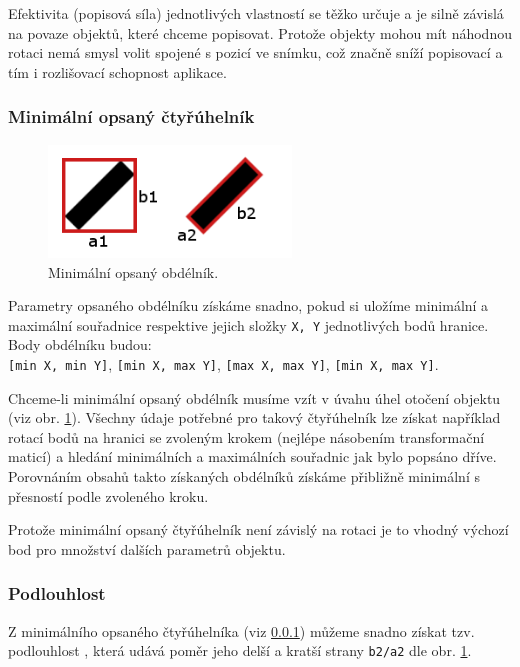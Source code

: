 \documentclass[12pt]{article}
\begin{document}
Efektivita (popisová síla) jednotlivých vlastností se těžko určuje a je silně závislá na povaze objektů, které chceme popisovat. Protože objekty mohou mít náhodnou rotaci nemá smysl volit spojené s pozicí ve snímku, což značně sníží popisovací a tím i rozlišovací schopnost aplikace.

\subsubsection{Minimální opsaný čtyřúhelník}
\label{minRectangle}
\begin{figure}
\centering
\vspace{-0.25cm}
\includegraphics[height=3cm]{MinRectangle.png}
\caption{Minimální opsaný obdélník.}
\label{minRectangle_obr}
\end{figure}
Parametry opsaného obdélníku získáme snadno, pokud si uložíme minimální a maximální souřadnice respektive jejich složky \texttt{X, Y} jednotlivých bodů hranice. Body obdélníku budou:\\ \texttt{[min X, min Y]}, \texttt{[min X, max Y]}, \texttt{[max X, max Y]}, \texttt{[min X, max Y]}.

Chceme-li minimální opsaný obdélník musíme vzít v úvahu úhel otočení objektu (viz obr. \ref{minRectangle_obr}). Všechny údaje potřebné pro takový čtyřúhelník lze získat například rotací bodů na hranici se zvoleným krokem (nejlépe násobením transformační maticí) a hledání minimálních a maximálních souřadnic jak bylo popsáno dříve. Porovnáním obsahů takto získaných obdélníků získáme přibližně minimální s přesností podle zvoleného kroku.

Protože minimální opsaný čtyřúhelník není závislý na rotaci je to vhodný výchozí bod pro množství dalších parametrů objektu.

\subsubsection{Podlouhlost}
Z minimálního opsaného čtyřúhelníka (viz \ref{minRectangle}) můžeme snadno získat tzv. podlouhlost , která udává poměr jeho delší a kratší strany \texttt{b2/a2} dle obr. \ref{minRectangle_obr}.
\end{document}
